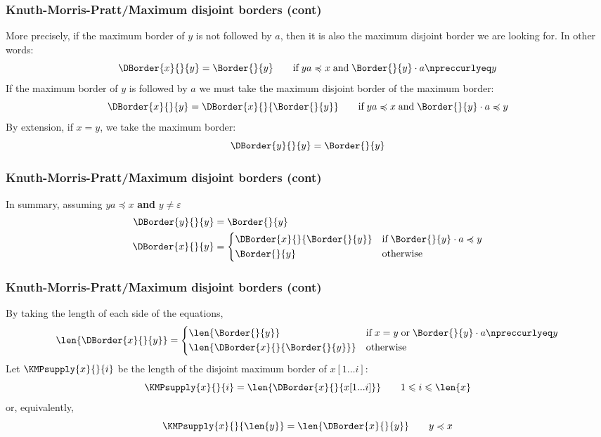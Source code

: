 %
\begin{frame}
\frametitle{Knuth-Morris-Pratt/Maximum disjoint borders (cont)}

More precisely, if the maximum border of \(y\) is not followed by
\(a\), then it is also the maximum disjoint border we are looking
for. In other words:
\[
\DBorder{x}{}{y} = \Border{}{y} \qquad \text{if} \; ya \preccurlyeq x
\; \text{and} \; \Border{}{y} \cdot a \npreccurlyeq y
\]
If the maximum border of \(y\) is followed by \(a\) we must take the
maximum disjoint border of the maximum border:
\[
\DBorder{x}{}{y} = \DBorder{x}{}{\Border{}{y}} 
\qquad \text{if} \; ya \preccurlyeq x \; \text{and} \; \Border{}{y}
\cdot a \preccurlyeq y
\]
By extension, if \(x = y\), we take the maximum border:
\[
\DBorder{y}{}{y} = \Border{}{y}
\]

\end{frame}

%
\begin{frame}
\frametitle{Knuth-Morris-Pratt/Maximum disjoint borders (cont)}

In summary, assuming \(ya \preccurlyeq x\) \textbf{and} \(y \neq
\varepsilon\)
\[
\begin{aligned}
   \DBorder{y}{}{y}
&= \Border{}{y}\\
   \DBorder{x}{}{y}
&= \left\lbrace
   \begin{aligned}
    &  \DBorder{x}{}{\Border{}{y}}
    && \text{if} \; \Border{}{y} \cdot a \preccurlyeq y\\
    &  \Border{}{y}
    && \text{otherwise}
   \end{aligned}
   \right.
\end{aligned}
\]

\end{frame}

%
\begin{frame}
\frametitle{Knuth-Morris-Pratt/Maximum disjoint borders (cont)}

By taking the length of each side of the equations,
\[
  \len{\DBorder{x}{}{y}}
= \left\lbrace
  \begin{aligned}
    &  \len{\Border{}{y}}
    && \text{if} \; x = y \; \text{or} 
       \; \Border{}{y} \cdot a \npreccurlyeq y\\
    &  \len{\DBorder{x}{}{\Border{}{y}}}
    && \text{otherwise}
  \end{aligned}
  \right.
\]
Let \(\KMPsupply{x}{}{i}\) be the length of the disjoint maximum border of
\(x[1 \dots i]\):
\[
\KMPsupply{x}{}{i} = \len{\DBorder{x}{}{x[1...i]}} 
\qquad 1 \leqslant i \leqslant \len{x}
\]
or, equivalently,
\[
\KMPsupply{x}{}{\len{y}} = \len{\DBorder{x}{}{y}} 
\qquad y \preccurlyeq x
\]

\end{frame}

